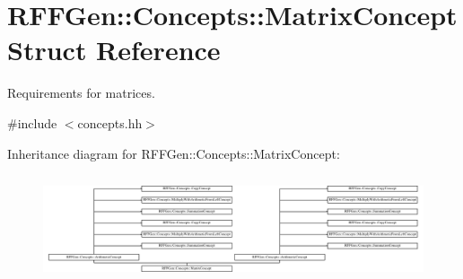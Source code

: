 \hypertarget{structRFFGen_1_1Concepts_1_1MatrixConcept}{\section{R\-F\-F\-Gen\-:\-:Concepts\-:\-:Matrix\-Concept Struct Reference}
\label{structRFFGen_1_1Concepts_1_1MatrixConcept}
}


Requirements for matrices.  




{\ttfamily \#include $<$concepts.\-hh$>$}

Inheritance diagram for R\-F\-F\-Gen\-:\-:Concepts\-:\-:Matrix\-Concept\-:\begin{figure}[H]
\begin{center}
\leavevmode
\includegraphics[height=3.172805cm]{structRFFGen_1_1Concepts_1_1MatrixConcept}
\end{center}
\end{figure}
